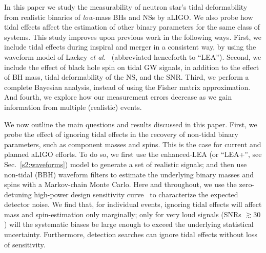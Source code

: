 \documentclass[aps,prd,amsmath,floats,floatfix, twocolumn,
superscriptaddress,nofootinbib,showpacs]{revtex4-1}
\newcommand{\red}{\textcolor{red}}
\begin{document}
In this paper we study the measurability of neutron star's tidal deformability
from realistic binaries of {\it low}-mass BHs and NSs by aLIGO. We also probe
how tidal effects affect the estimation of other binary parameters for the same
class of systems. This study improves upon previous work in the following ways.
% 
First, we include tidal effects during inspiral and merger in a consistent
way, by using the waveform model of Lackey {\it et al.}~\cite{Lackey:2013axa}
(abbreviated henceforth to ``LEA'').
% 
Second, we include the effect of black hole spin on tidal GW signals, in
addition to the effect of BH mass, tidal deformability of the NS, and the SNR.
% 
Third, we perform a complete Bayesian analysis, instead of using the Fisher matrix
approximation.
% 
And fourth, we explore how our measurement errors decrease as we gain information
from multiple (realistic) events.
% 


We now outline the main questions and results discussed in this paper.
First, we probe the effect of ignoring tidal effects in
the recovery of non-tidal binary parameters, such as 
component masses and spins. This is the case for current and planned aLIGO
efforts.
To do so, we first use the enhanced-LEA (or ``LEA+'', see Sec.~\ref{s2:waveforms})
model to generate a set of realistic signals;
and then use non-tidal (BBH) waveform filters to estimate the underlying
binary masses and spins with a Markov-chain Monte Carlo. Here and throughout,
we use the zero-detuning high-power design sensitivity curve~\cite{Shoemaker2009}
to characterize the expected detector noise.
% 
We find that, for individual events, ignoring tidal effects will affect mass
and spin-estimation only marginally; only for very loud signals (SNRs $\gtrsim 30$)
will the systematic biases be large enough to exceed the underlying
statistical uncertainty. Furthermore, detection searches can ignore tidal
effects without loss of sensitivity.


\end{document}
